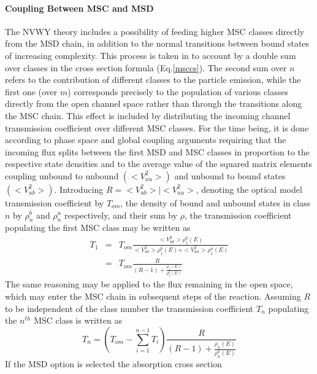 \documentclass[twocolumn,amsmath,amssymb,10pt,groupedaddress,letter]{revtex4}
\begin{document}
\paragraph{Coupling Between MSC and MSD}
The NVWY theory includes a possibility of feeding higher
MSC classes directly from the MSD chain, in addition to
the normal transitions between bound states of increasing complexity.
This process is taken in to account by a double sum over classes in
the cross section formula (Eq.\ref{msccs}). The second sum over $n$
refers to the contribution of different classes to the particle emission,
while the first one (over $m$) corresponds precisely to the population
of various classes directly from the open channel space rather than
through the transitions along the MSC chain. This effect is included
by distributing the incoming channel transmission
coefficient over different MSC classes. For the time being,
it is done according to phase space and global coupling arguments
requiring that the incoming flux splits between the first MSD
and MSC classes in proportion to the respective state densities and
to the average value of the squared matrix elements coupling unbound
to unbound $(<V_{uu}^{2}>)$ and unbound to bound states $(<V_{ub}^{2}>)$.
Introducing $R=<V_{ub}^{2}>\mid<V_{uu}^{2}>$, denoting the optical
model transmission coefficient by $T_{om}$, the density of bound
and unbound states in class $n$ by $\rho_{n}^{b}$ and $\rho_{n}^{u}$
respectively, and their sum by $\rho$, the transmission coefficient
populating the first MSC class may be written as
\begin{eqnarray}
T_{1}&=&T_{om}\frac{<V_{ub}^{2}>\rho_{1}^{b}(E)}{<V_{ub}^{2}>\rho_{1}^{b}(E)+<V_{uu}^{2}>\rho_{1}^{u}(E)}\nonumber\\
&=&T_{om}\frac{R}{(R-1)+\frac{\rho_{1}(E)}{\rho_{1}^{b}(E)}}\label{eq9}
\end{eqnarray}
The same reasoning may be applied to the flux remaining in the open
space, which may enter the MSC chain in subsequent steps
of the reaction. Assuming $R$ to be independent of the class number
the transmission coefficient $T_{n}$ populating the $n^{th}$ MSC
class is written as
\begin{equation}
T_{n}=\left(T_{om}-\sum_{i=1}^{n-1}T_{i}\right)\frac{R}{(R-1)+\frac{\rho_{n}(E)}{\rho_{n}^{b}(E)}}\label{eq10}\end{equation}
If the MSD option is selected the absorption cross section
\end{document}
